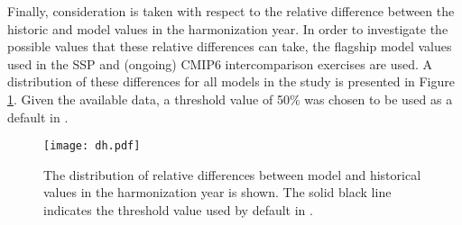 Finally, consideration is taken with respect to the relative difference between
the historic and model values in the harmonization year. In order to investigate
the possible values that these relative differences can take, the flagship model
values used in the SSP  and (ongoing) CMIP6 intercomparison exercises
are used. A distribution of these differences for all models in the study is
presented in Figure \ref{fig:dh}. Given the available data, a threshold value of
50\% was chosen to be used as a default in .

\begin{figure}
  \begin{center}
    \texttt{[image: dh.pdf]}
    \caption[]{
      \label{fig:dh}
      The distribution of relative differences between model and historical
      values in the harmonization year is shown. The solid black line indicates
      the threshold value used by default in .  
    }
  \end{center}
\end{figure}

